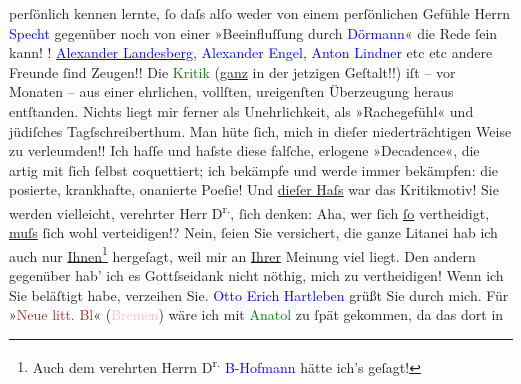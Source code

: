                     perſönlich kennen lernte, ſo daſs alſo weder von einem perſönlichen Gefühle {\pb}Herrn \textcolor{blue}{Specht}{}\ledrightnote{\textcolor{blue}{Richard Specht}} gegenüber noch von einer »Beeinfluſſung durch \textcolor{blue}{Dörmann}{}\ledrightnote{\textcolor{blue}{Felix Dörmann}}« die Rede ſein kann!\pend
           \pstart
           !\pend
           \pstart
           \textcolor{blue}{\uline{Alexander Landesberg}}{}\ledrightnote{\textcolor{blue}{Alexander Landesberg}}, \textcolor{blue}{Alexander Engel}{}\ledrightnote{\textcolor{blue}{Alexander Engel}}, \textcolor{blue}{Anton Lindner}{}\ledrightnote{\textcolor{blue}{Anton Lindner}} etc etc andere Freunde ſind Zeugen!!\pend
           \pstart
           Die \textcolor{green}{Kritik}{} (\uline{ganz} in der jetzigen Geſtalt!!) iſt – vor
                    Monaten – aus einer ehrlichen, vollſten, ureigenſten Überzeugung heraus
                    entſtanden. Nichts liegt mir ferner als Unehrlichkeit, als »Rachegefühl« und
                    jüdiſches Tagſschreiberthum. Man hüte ſich, mich in dieſer niederträchtigen
                    Weise zu verleumden!!\pend
           \pstart
           Ich haſſe und haſste diese falſche, erlogene »Decadence«, die artig mit ſich
                    ſelbst coquettiert; ich bekämpfe und werde immer bekämpfen: die posierte,
                    krankhafte, onanierte Poeſie! {\pb}Und
                        \uline{dieſer Haſs} war das Kritikmotiv!\pend
           \pstart
            Sie werden vielleicht, verehrter Herr
                        D\textsuperscript{r.}, ſich denken: Aha, wer ſich \uline{ſo} vertheidigt, \uline{muſs}{ }ſich wohl verteidigen!?  Nein, ſeien Sie versichert, die ganze Litanei
                    hab ich auch nur \uline{Ihnen}\footnote{\noindent{}Auch dem verehrten Herrn D\textsuperscript{r.}{ }\textcolor{blue}{B-Hofmann} hätte ich’s geſagt!} hergeſagt, weil mir an \uline{Ihrer} Meinung
                         viel liegt. Den andern gegenüber hab’
                    ich es Gottſseidank nicht nöthig, mich zu vertheidigen!\pend
           \pstart
           Wenn ich Sie beläſtigt habe, verzeihen Sie.\pend
           \pstart
           \textcolor{blue}{Otto Erich Hartleben}{}\ledrightnote{\textcolor{blue}{Otto Erich Hartleben}} grüßt Sie durch
                    mich.\pend
           \pstart
           Für »\textcolor{brown}{Neue litt. Bl}{}\ledrightnote{\textcolor{brown}{Neue litterarische Blätter}}« \introOben{}(\textcolor{pink}{Bremen}{}\ledrightnote{\textcolor{pink}{Bremen}})\introOben{} wäre ich mit \textcolor{green}{Anatol}{}\ledrightnote{\textcolor{green}{Anatol}} zu ſpät gekommen, da das dort in
